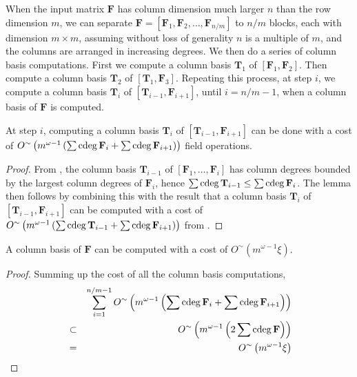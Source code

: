When the input matrix $\mathbf{F}$ has column dimension much larger
$n$ than the row dimension $m$, we can separate $\mathbf{F}=\left[\mathbf{F}_{1},\mathbf{F}_{2},\dots,\mathbf{F}_{n/m}\right]$
to $n/m$ blocks, each with dimension $m\times m$, assuming without
loss of generality $n$ is a multiple of $m$, and the columns are
arranged in increasing degrees. We then do a series of column basis
computations. First we compute a column basis $\mathbf{T}_{1}$ of
$\left[\mathbf{F}_{1},\mathbf{F}_{2}\right]$. Then compute a column
basis $\mathbf{T}_{2}$ of $\left[\mathbf{T}_{1},\mathbf{F}_{3}\right]$.
Repeating this process, at step $i$, we compute a column basis $\mathbf{T}_{i}$
of $\left[\mathbf{T}_{i-1},\mathbf{F}_{i+1}\right]$, until $i=n/m-1$,
when a column basis of $\mathbf{F}$ is computed.
\begin{lem}
At step $i$, computing a column basis $\mathbf{T}_{i}$ of $\left[\mathbf{T}_{i-1},\mathbf{F}_{i+1}\right]$
can be done with a cost of $O^{\sim}\left(m^{\omega-1}\left(\sum\cdeg\mathbf{F}_{i}+\sum\cdeg\mathbf{F}_{i+1}\right)\right)$
field operations.\end{lem}
\begin{proof}
From , the column
basis $\mathbf{T}_{i-1}$ of $\left[\mathbf{F}_{1},\dots,\mathbf{F}_{i}\right]$
has column degrees bounded by the largest column degrees of $\mathbf{F}_{i}$,
hence $\sum\cdeg\mathbf{T}_{i-1}\le\sum\cdeg\mathbf{F}_{i}$. The
lemma then follows by combining this with the result that a column
basis $\mathbf{T}_{i}$ of $\left[\mathbf{T}_{i-1},\mathbf{F}_{i+1}\right]$
can be computed with a cost of $O^{\sim}\left(m^{\omega-1}\left(\sum\cdeg\mathbf{T}_{i-1}+\sum\cdeg\mathbf{F}_{i+1}\right)\right)$
from .\end{proof}
\begin{thm}
\label{thm:finalCollBasisCost}A column basis of $\mathbf{F}$ can
be computed with a cost of $O^{\sim}\left(m^{\omega-1}\xi\right)$.\end{thm}
\begin{proof}
Summing up the cost of all the column basis computations, 
\begin{eqnarray*}
 &  & \sum_{i=1}^{n/m-1}O^{\sim}\left(m^{\omega-1}\left(\sum\cdeg\mathbf{F}_{i}+\sum\cdeg\mathbf{F}_{i+1}\right)\right)\\
 & \subset & O^{\sim}\left(m^{\omega-1}\left(2\sum\cdeg\mathbf{F}\right)\right)\\
 & = & O^{\sim}\left(m^{\omega-1}\xi\right)
\end{eqnarray*}
\end{proof}
